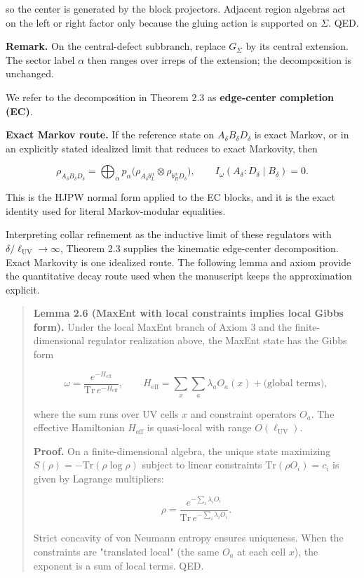 so the center is generated by the block projectors. Adjacent region algebras act on the left or right factor only because the gluing action is supported on \(\Sigma\). QED.

\textbf{Remark.} On the central-defect subbranch, replace \(G_\Sigma\) by its central extension. The sector label \(\alpha\) then ranges over irreps of the extension; the decomposition is unchanged.

We refer to the decomposition in Theorem 2.3 as \textbf{edge-center completion (EC)}.

\textbf{Exact Markov route.} If the reference state on \(A_\delta B_\delta D_\delta\) is exact Markov, or in an explicitly stated idealized limit that reduces to exact Markovity, then

\[
\rho_{A_\delta B_\delta D_\delta}
= \bigoplus_\alpha p_\alpha
\bigl(\rho_{A_\delta b_L^\alpha} \otimes \rho_{b_R^\alpha D_\delta}\bigr),
\qquad
I_\omega(A_\delta:D_\delta \mid B_\delta)=0.
\]

This is the HJPW normal form applied to the EC blocks, and it is the exact identity used for
literal Markov-modular equalities.

Interpreting collar refinement as the inductive limit of these regulators with \(\delta/\ell_{\mathrm{UV}} \to \infty\), Theorem 2.3 supplies the kinematic edge-center decomposition. Exact Markovity is one idealized route. The following lemma and axiom provide the quantitative decay route used when the manuscript keeps the approximation explicit.

\begin{quote}
\textbf{Lemma 2.6 (MaxEnt with local constraints implies local Gibbs form).} Under the local MaxEnt branch of Axiom 3 and the finite-dimensional regulator realization above, the MaxEnt state has the Gibbs form

\[
\omega = \frac{e^{-H_{\mathrm{eff}}}}{\mathrm{Tr}\,e^{-H_{\mathrm{eff}}}},
\qquad
H_{\mathrm{eff}} = \sum_x \sum_a \lambda_a O_a(x) + \text{(global terms)},
\]

where the sum runs over UV cells \(x\) and constraint operators \(O_a\). The effective Hamiltonian \(H_{\mathrm{eff}}\) is quasi-local with range \(O(\ell_{\mathrm{UV}})\).

\textbf{Proof.} On a finite-dimensional algebra, the unique state maximizing \(S(\rho) = -\mathrm{Tr}(\rho \log \rho)\) subject to linear constraints \(\mathrm{Tr}(\rho O_i) = c_i\) is given by Lagrange multipliers:

\[
\rho = \frac{e^{-\sum_i \lambda_i O_i}}{\mathrm{Tr}\,e^{-\sum_i \lambda_i O_i}}.
\]

Strict concavity of von Neumann entropy ensures uniqueness. When the constraints are "translated local" (the same \(O_a\) at each cell \(x\)), the exponent is a sum of local terms. QED.
\end{quote}

